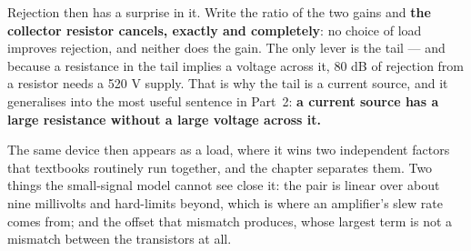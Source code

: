 Rejection then has a surprise in it. Write the ratio of the two gains and \textbf{the collector
resistor cancels, exactly and completely}: no choice of load improves rejection, and neither does
the gain. The only lever is the tail --- and because a resistance in the tail implies a voltage
across it, 80 dB of rejection from a resistor needs a 520 V supply. That is why the tail is a
current source, and it generalises into the most useful sentence in Part~2: \textbf{a current
source has a large resistance without a large voltage across it.}

The same device then appears as a load, where it wins two independent factors that textbooks
routinely run together, and the chapter separates them. Two things the small-signal model cannot
see close it: the pair is linear over about nine millivolts and hard-limits beyond, which is where
an amplifier's slew rate comes from; and the offset that mismatch produces, whose largest term is
not a mismatch between the transistors at all.





